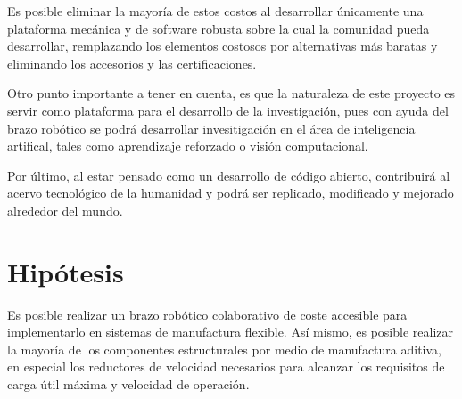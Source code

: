 Es posible eliminar la mayoría de estos costos al desarrollar únicamente una plataforma mecánica y de software robusta sobre la cual la comunidad pueda desarrollar, remplazando los elementos costosos por alternativas más baratas y eliminando los accesorios y las certificaciones.

Otro punto importante a tener en cuenta, es que la naturaleza de este proyecto es servir como plataforma para el desarrollo de la investigación, pues con ayuda del brazo robótico se podrá desarrollar invesitigación en el área de inteligencia artifical, tales como aprendizaje reforzado o visión computacional.

Por último, al estar pensado como un desarrollo de código abierto, contribuirá al acervo tecnológico de la humanidad y podrá ser replicado, modificado y mejorado alrededor del mundo. 


\section{Hipótesis}

Es posible realizar un brazo robótico colaborativo de coste accesible para implementarlo en sistemas de manufactura flexible. Así mismo, es posible realizar la mayoría de los componentes estructurales por medio de manufactura aditiva, en especial los reductores de velocidad necesarios para alcanzar los requisitos de carga útil máxima y velocidad de operación.

